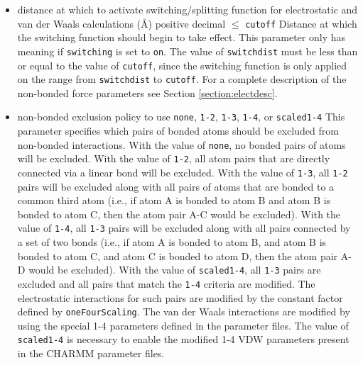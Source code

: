 \begin{itemize}

\item
{}
{distance at which to activate switching/splitting function 
for electrostatic and van der Waals calculations (\AA)}
{positive decimal $\leq$ {\tt cutoff}}
{Distance at which the switching function
should begin to take effect.  
This parameter only has meaning if {\tt switching} is 
set to {\tt on}.  
The value of {\tt switchdist} must be less than
or equal to the value of {\tt cutoff}, since the switching function
is only applied on the range from {\tt switchdist} to {\tt cutoff}.  
For a complete description of the non-bonded force parameters see
Section \ref{section:electdesc}.}

\item
{}
{non-bonded exclusion policy to use}
{{\tt none}, {\tt 1-2}, {\tt 1-3}, {\tt 1-4}, or {\tt scaled1-4}}
{\label{param:exclude}
This parameter specifies which pairs of bonded atoms should
be excluded from non-bonded
interactions.  With the value of {\tt none}, no bonded pairs of atoms 
will be excluded.  With the value of {\tt 1-2}, all atom pairs that
are directly connected via a linear bond will be excluded.  With the
value of {\tt 1-3}, all {\tt 1-2} pairs will be excluded along with
all pairs of atoms that are bonded to a common
third atom (i.e., if atom A is bonded to atom B and atom B is bonded
to atom C, then the atom pair A-C would be excluded).
With the value of {\tt 1-4}, all {\tt 1-3} pairs will be excluded along
with all pairs connected by a set of two bonds (i.e., if atom A is bonded
to atom B, and atom B is bonded to atom C, and atom C is bonded to
atom D, then the atom pair A-D would be excluded).  With the value
of {\tt scaled1-4}, all {\tt 1-3} pairs are excluded and all pairs
that match the {\tt 1-4} criteria are modified.  The electrostatic
interactions for such pairs are modified by the constant factor
defined by {\tt oneFourScaling}.
The van der Waals interactions are modified
by using the special 1-4 parameters defined in the parameter files.
The value of {\tt scaled1-4} is necessary to enable the modified
1-4 VDW parameters present in the CHARMM parameter files.
}


\end{itemize}
